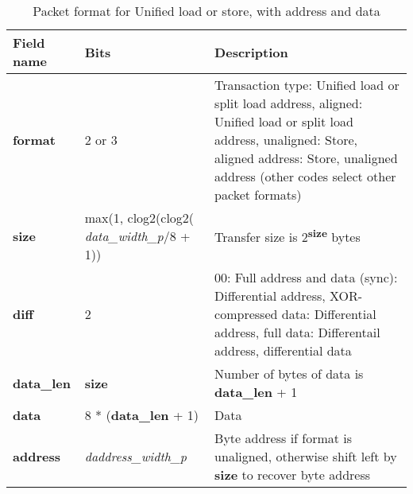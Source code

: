 \begin{table}[htp]
  \centering
  \caption{Packet format for Unified load or store, with address and data}
  \label{tab:te_datadx0y0}
  \begin{tabulary}{\textwidth}{|l|p{38mm}|p{92mm}|}
    \hline
    {\bf Field name} & {\bf Bits} & {\bf Description} \\
    \hline
    \textbf{format} & 	2 or 3	& Transaction type: Unified load or split load address, aligned: Unified load or split load address, unaligned: Store, aligned address: Store, unaligned address\newline	
		(other codes select other packet formats)\\
    \hline
    \textbf{size} & max(1, clog2(clog2( \textit{data\_width\_p}/8 + 1)) & Transfer size is 2\textsuperscript{\textbf{size}} bytes \\
    \hline
    \textbf{diff} & 2 & 00: Full address and data (sync): Differential address, XOR-compressed data: Differential address, full data: Differentail address, differential data\\
    \hline
    \textbf{data\_len}	& \textbf{size} & Number of bytes of data is \textbf{data\_len} + 1	\\
    \hline
    \textbf{data} & 8 * (\textbf{data\_len} + 1) & 
                Data\\
    \hline
    \textbf{address} &  \textit{daddress\_width\_p} & Byte address if format is unaligned, otherwise shift left by \textbf{size} to recover byte address \\
    \hline
  \end{tabulary}
\end{table}


